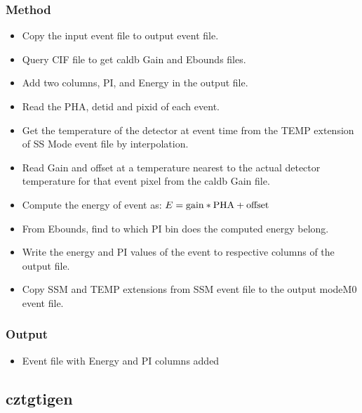 \documentclass[11pt,oneside,a4paper]{article}
\begin{document}
\subsubsection*{Method}
\begin{itemize}

\item{Copy  the  input  event  file  to  output  event  file.}

\item{Query CIF file to get caldb Gain and Ebounds files.}

\item{Add  two  columns,  PI,  and Energy  in  the  output  file.}

\item{Read  the  PHA,  detid  and  pixid  of  each  event.}

\item{Get  the  temperature  of  the  detector  at  event  time  from  the  TEMP  extension 
of SS Mode event file by interpolation. }

\item{Read  Gain  and  offset  at  a  temperature  nearest  to  the  actual  detector
temperature for that event pixel from  the caldb Gain file. }

\item{Compute the energy of event as:
$E = \mbox{\rm gain}*\mbox{\rm PHA} + \mbox{\rm offset}$}


\item{From  Ebounds,  find  to which  PI  bin does the  computed  energy  belong.} 

\item{Write the energy and PI values of the event to respective columns of the 
output file.}

\item{Copy SSM and TEMP extensions from SSM event file to the output modeM0 event file.}

\end{itemize}
\subsubsection*{Output}
\begin{itemize}
\item{Event file with Energy and PI columns added}
\end{itemize}


\subsection{cztgtigen}
\end{document}

